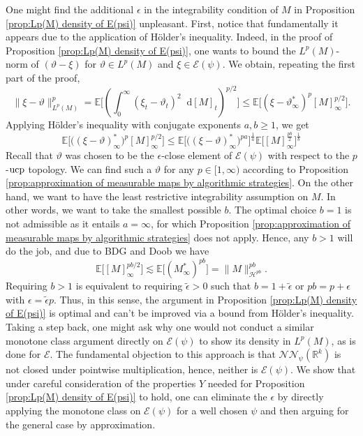 \documentclass[11pt,a4paper,twoside,openany]{report}
\numberwithin{equation}{section}
\newcommand{\diff}{\mathop{}\!\mathrm{d}}
\theoremstyle{plain} %
\theoremstyle{definition} %
\theoremstyle{remark} %
\begin{document}
One might find the additional \(\epsilon\) in the integrability condition of \(M\) in Proposition \ref{prop:Lp(M) density of E(psi)} unpleasant. First, notice that fundamentally it appears due to the application of Hölder's inequality. Indeed, in the proof of Proposition \ref{prop:Lp(M) density of E(psi)}, one wants to bound the \(L^p(M)\)-norm of \((\vartheta-\xi)\) for \(\vartheta\in L^p(M)\) and \(\xi\in\mathcal{E}(\psi)\). We obtain, repeating the first part of the proof, 
 \begin{equation*}
        \rVert \xi-\vartheta\lVert_{L^p(M)}^p=\mathbb{E}\Big[\left(\int_{0}^{\infty}(\xi_t-\vartheta_t)^2\diff[M]_t\right)^{p/2}\Big]\leq\mathbb{E}\big[(\xi-\vartheta_{\infty}^*)^p[M]_{\infty}^{p/2}\big].
\end{equation*}\;
Applying Hölder's inequality with conjugate exponents \(a,b\geq 1\), we get 
\begin{equation*}
    \mathbb{E}\big[\big((\xi-\vartheta)_{\infty}^*\big)^p[M]_{\infty}^{p/2}\big]\leq \mathbb{E}\big[\big((\xi-\vartheta)_{\infty}^*\big)^{pa}\big]^{\frac{1}{a}}\mathbb{E}\big[[M]_{\infty}^{\frac{pb}{2}}\big]^{\frac{1}{b}}
\end{equation*}
Recall that \(\vartheta\) was chosen to be the \(\epsilon\)-close element of \(\mathcal{E}(\psi)\) with respect to the \(p\)-\(\rm{ucp}\) topology. We can find such a \(\vartheta\) for any \(p\in[1,\infty)\) according to Proposition \ref{prop:approximation of measurable maps by algorithmic strategies}. On the other hand, we want to have the least restrictive integrability assumption on \(M\). In other words, we want to take the smallest possible \(b\). The optimal choice \(b=1\) is not admissible as it entails \(a=\infty\), for which Proposition \ref{prop:approximation of measurable maps by algorithmic strategies} does not apply. Hence, any \(b>1\) will do the job, and due to BDG and Doob we have
\begin{equation*}
    \mathbb{E}\big[[M]_{\infty}^{pb/2}\big]\lesssim\mathbb{E}\big[(M_{\infty}^*)^{pb}\big]=\lVert M\rVert_{\mathcal{H}^{pb}}^{pb}.
\end{equation*}
Requiring \(b>1\) is equivalent to requiring \(\tilde{\epsilon}>0\) such that \(b=1+\tilde{\epsilon}\) or \(pb=p+\epsilon\) with \(\epsilon=\tilde{\epsilon}p\). Thus, in this sense, the argument in Proposition \ref{prop:Lp(M) density of E(psi)} is optimal and can't be improved via a bound from Hölder's inequality. Taking a step back, one might ask why one would not conduct a similar monotone class argument directly on \(\mathcal{E}(\psi)\) to show its density in \(L^p(M)\), as is done for \(\mathcal{E}\). The fundamental objection to this approach is that \(\mathcal{NN}_{\psi}(\mathbb{R}^k)\) is not closed under pointwise multiplication, hence, neither is \(\mathcal{E}(\psi)\). We show that under careful consideration of the properties \(Y\) needed for Proposition \ref{prop:Lp(M) density of E(psi)} to hold, one can eliminate the \(\epsilon\) by directly applying the monotone class on \(\mathcal{E}(\psi)\) for a well chosen \(\psi\) and then arguing for the general case by approximation.
\end{document}
